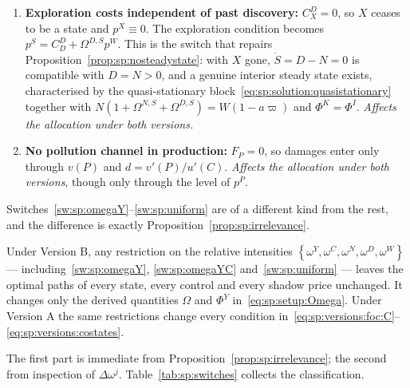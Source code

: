\begin{enumerate}[label=\textbf{(W\arabic*)},ref=W\arabic*,leftmargin=3.2em,itemsep=0.35em]
\item\label{sw:sp:CDX} \textbf{Exploration costs independent of past discovery:} $C^D_X=0$, so $X$
ceases to be a state and $p^X\equiv0$. The exploration condition becomes
$p^S=C^D_D+\Omega^{D,S}p^W$. This is the switch that repairs
Proposition~\ref{prop:sp:nosteadystate}: with $X$ gone, $\dot S=D-N=0$ is compatible with $D=N>0$,
and a genuine interior steady state exists, characterised by the quasi-stationary
block~\eqref{eq:sp:solution:quasistationary} together with
$N\left(1+\Omega^{N,S}+\Omega^{D,S}\right)=W\left(1-a\varpi\right)$ and $\Phi^K=\Phi^I$.
\emph{Affects the allocation under both versions.}

\item\label{sw:sp:nopoll} \textbf{No pollution channel in production:} $F_P=0$, so damages enter
only through $v(P)$ and $d=v'(P)/u'(C)$. \emph{Affects the allocation under both versions}, though
only through the level of $p^P$.

\end{enumerate}

 Switches~\ref{sw:sp:omegaY}--\ref{sw:sp:uniform} are of a different
kind from the rest, and the difference is exactly Proposition~\ref{prop:sp:irrelevance}.

\begin{proposition}
\label{prop:sp:inert}
Under Version B, any restriction on the relative intensities $\left\{\omega^Y,\omega^C,\omega^{N},
\omega^{D},\omega^W\right\}$ --- including~\ref{sw:sp:omegaY}, \ref{sw:sp:omegaYC}
and~\ref{sw:sp:uniform} --- leaves the optimal paths of every state, every control and every shadow
price unchanged. It changes only the derived quantities $\Omega$ and $\Phi^Y$
in~\eqref{eq:sp:setup:Omega}. Under Version A the same restrictions change every condition
in~\eqref{eq:sp:versions:foc:C}--\eqref{eq:sp:versions:costates}.
\end{proposition}

The first part is immediate from Proposition~\ref{prop:sp:irrelevance}; the second from inspection of
$\Delta\omega^j$. Table~\ref{tab:sp:switches} collects the classification.

